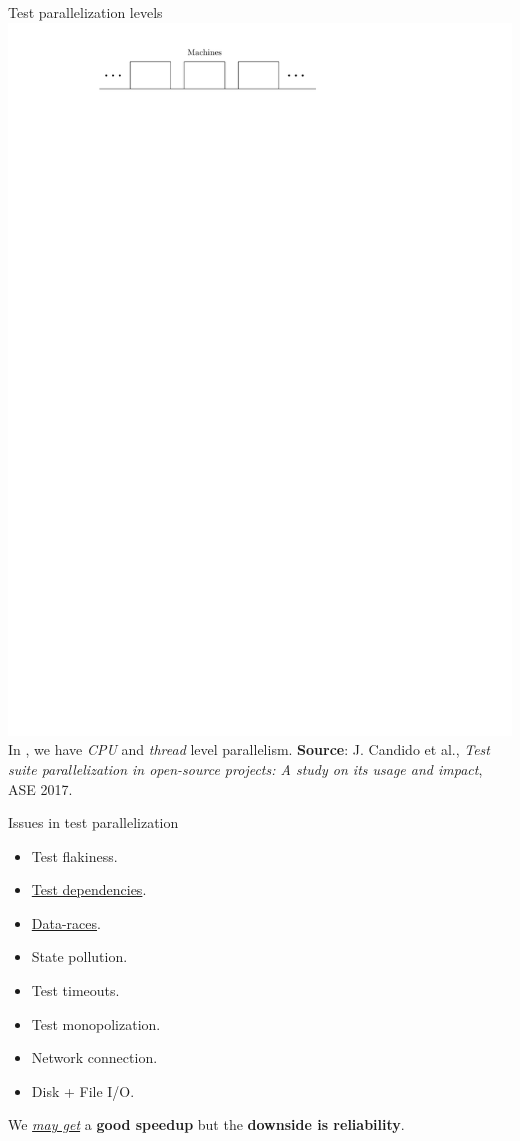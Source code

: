 \documentclass{beamer}
\begin{document}
\begin{frame}{Test parallelization levels}
	\centering
	\includegraphics[width=\linewidth,page=3]{images/intro.pdf}
\vfill
In {\rsm \tname{}}, we have \textit{CPU} and \textit{thread} level parallelism.	
\vfill
\fontsize{4}{4}\selectfont\textbf{Source}: J. Candido et al., \textit{Test suite parallelization in open-source projects: A study on its usage and impact}, ASE 2017.
\end{frame}

\begin{frame}{Issues in test parallelization}
\begin{itemize}
	\item{Test flakiness.}
	\item{\underline{Test dependencies}.}
	\item{\underline{Data-races}.}
	\item{State pollution.}\pause
	\item{Test timeouts.}
	\item{Test monopolization}.\pause
	\item{Network connection.}
	\item{Disk + File I/O.}\pause
\end{itemize}
\vfill
{We \underline{\textit{may get}} a {\color{indiagreen}\textbf{good speedup}} but the {\color{red}\textbf{downside is reliability}}.}
\end{frame}
\end{document}

